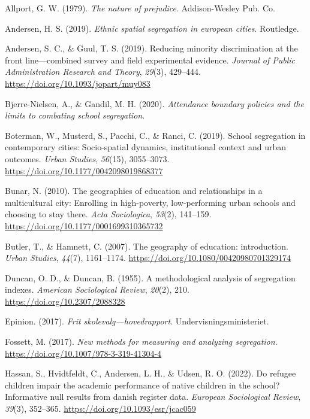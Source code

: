 \documentclass[
]{book}
\newlength{\cslhangindent}
\newenvironment{CSLReferences}[2] %
 {\begin{list}{}{%
  \setlength{\itemindent}{0pt}
  \setlength{\leftmargin}{0pt}
  \setlength{\parsep}{0pt}
  \ifodd #1
   \setlength{\leftmargin}{\cslhangindent}
   \setlength{\itemindent}{-1\cslhangindent}
  \fi
  \setlength{\itemsep}{#2\baselineskip}}}
 {\end{list}}
\begin{document}
\label{refs}
\begin{CSLReferences}{1}{0}
Allport, G. W. (1979). \emph{The nature of prejudice}. Addison-Wesley Pub. Co.

Andersen, H. S. (2019). \emph{Ethnic spatial segregation in european cities}. Routledge.

Andersen, S. C., \& Guul, T. S. (2019). Reducing minority discrimination at the front line---combined survey and field experimental evidence. \emph{Journal of Public Administration Research and Theory}, \emph{29}(3), 429--444. \url{https://doi.org/10.1093/jopart/muy083}

Bjerre-Nielsen, A., \& Gandil, M. H. (2020). \emph{Attendance boundary policies and the limits to combating school segregation}.

Boterman, W., Musterd, S., Pacchi, C., \& Ranci, C. (2019). School segregation in contemporary cities: Socio-spatial dynamics, institutional context and urban outcomes. \emph{Urban Studies}, \emph{56}(15), 3055--3073. \url{https://doi.org/10.1177/0042098019868377}

Bunar, N. (2010). The geographies of education and relationships in a multicultural city: Enrolling in high-poverty, low-performing urban schools and choosing to stay there. \emph{Acta Sociologica}, \emph{53}(2), 141--159. \url{https://doi.org/10.1177/0001699310365732}

Butler, T., \& Hamnett, C. (2007). The geography of education: introduction. \emph{Urban Studies}, \emph{44}(7), 1161--1174. \url{https://doi.org/10.1080/00420980701329174}

Duncan, O. D., \& Duncan, B. (1955). A methodological analysis of segregation indexes. \emph{American Sociological Review}, \emph{20}(2), 210. \url{https://doi.org/10.2307/2088328}

Epinion. (2017). \emph{Frit skolevalg---hovedrapport}. Undervisningsministeriet.

Fossett, M. (2017). \emph{New methods for measuring and analyzing segregation}. \url{https://doi.org/10.1007/978-3-319-41304-4}

Hassan, S., Hvidtfeldt, C., Andersen, L. H., \& Udsen, R. O. (2022). Do refugee children impair the academic performance of native children in the school? Informative null results from danish register data. \emph{European Sociological Review}, \emph{39}(3), 352--365. \url{https://doi.org/10.1093/esr/jcac059}


\end{CSLReferences}
\end{document}
